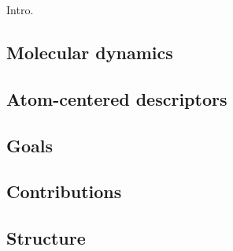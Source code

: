 Intro.

\subsection{Molecular dynamics}

\subsection{Atom-centered descriptors}

\subsection{Goals}

\subsection{Contributions}

\subsection{Structure}
